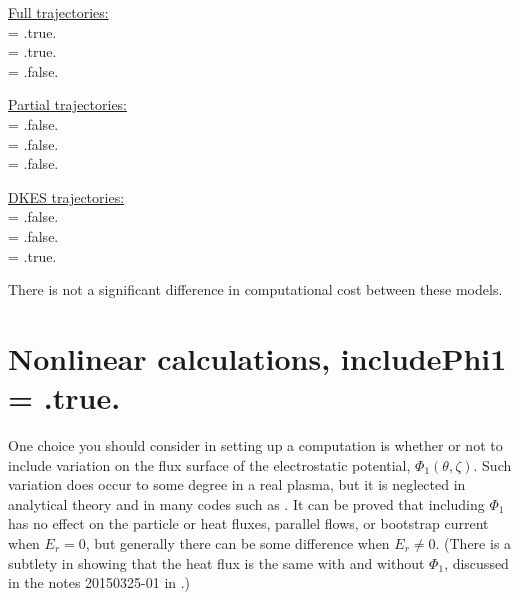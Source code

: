 {\setlength{\parindent}{0cm}

\underline{Full trajectories:}\\
{\ttfamily 
{} = .true.\\
 = .true.\\
 = .false.\\
}

\underline{Partial trajectories:}\\
{\ttfamily
{} = .false.\\
 = .false.\\
 = .false.\\
}

\underline{DKES trajectories:}\\
{\ttfamily
{} = .false.\\
 = .false.\\
 = .true.\\
}
}

There is not a significant difference in computational cost between these models.


\section{Nonlinear calculations, includePhi1 = {\ttfamily .true.}}
\label{sec:qn}

One choice you should consider in setting up a computation is whether or not
to include variation on the flux surface of the electrostatic potential, $\Phi_1(\theta,\zeta)$.
Such variation does occur to some degree in a real plasma, but it is 
neglected in analytical theory and in many codes such as \dkes.  It can be proved
that including $\Phi_1$ has no effect on the particle or heat fluxes, parallel flows, or bootstrap current
when $E_r=0$, but generally there can be some difference when $E_r \ne 0$.
(There is a subtlety in showing that the heat flux is the same with and without $\Phi_1$,
discussed in the notes 20150325-01 in .) 

